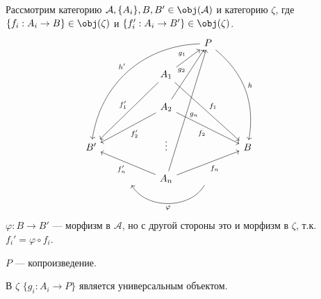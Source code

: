 Рассмотрим категорию \(\mathcal{A}, \{A_i\}, B, B' \in \obj(\mathcal{A})\) и категорию \(\zeta\), где \(\{f_i : A_i \to B\} \in \obj(\zeta)\) и \(\{f_i' : A_i \to B'\} \in \obj(\zeta)\).
\[\begin{tikzcd}
        &&& P \arrow[bend left]{dddr}{h}\arrow[bend right = 40, swap ]{dddlll}{h'} && \\
        && \arrow{ur}{g_1} \arrow[swap]{ddll}{f_1'} \arrow{ddrr}{f_1} A_1 && \\
        && \arrow{uur}{g_2} \arrow{dll}{f_2'} \arrow[swap]{drr}{f_2} A_2 && \\
        B' && \vdots && B \\
        & {} & \arrow[swap]{uuuur}{g_n} \arrow{ull}{f_n'} \arrow[swap]{urr}{f_n} A_n & {}\arrow[bend left = 60]{ll}{\varphi} & \\
    \end{tikzcd}\]
\(\varphi : B \to B'\) --- морфизм в \(\mathcal{A}\), но с другой стороны это и морфизм в \(\zeta\), т.к. \(f_i' = \varphi \circ f_i\).

\(P\) --- копроизведение.

В \(\zeta\) \(\{g_i : A_i \to P\}\) является универсальным объектом.

